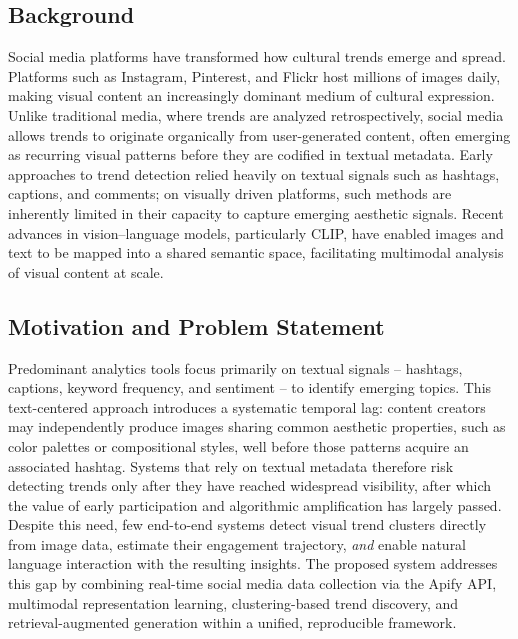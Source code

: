 \documentclass[conference]{IEEEtran}
\begin{document}
\subsection{Background}
Social media platforms have transformed how cultural trends emerge and spread. Platforms such as Instagram, Pinterest, and Flickr host millions of images daily, making visual content an increasingly dominant medium of cultural expression. Unlike traditional media, where trends are analyzed retrospectively, social media allows trends to originate organically from user-generated content, often emerging as recurring visual patterns before they are codified in textual metadata. Early approaches to trend detection relied heavily on textual signals such as hashtags, captions, and comments; on visually driven platforms, such methods are inherently limited in their capacity to capture emerging aesthetic signals. Recent advances in vision--language models, particularly CLIP, have enabled images and text to be mapped into a shared semantic space, facilitating multimodal analysis of visual content at scale.

\subsection{Motivation and Problem Statement}
Predominant analytics tools focus primarily on textual signals -- hashtags, captions, keyword frequency, and sentiment -- to identify emerging topics. This text-centered approach introduces a systematic temporal lag: content creators may independently produce images sharing common aesthetic properties, such as color palettes or compositional styles, well before those patterns acquire an associated hashtag. Systems that rely on textual metadata therefore risk detecting trends only after they have reached widespread visibility, after which the value of early participation and algorithmic amplification has largely passed. Despite this need, few end-to-end systems detect visual trend clusters directly from image data, estimate their engagement trajectory, \emph{and} enable natural language interaction with the resulting insights. The proposed system addresses this gap by combining real-time social media data collection via the Apify API, multimodal representation learning, clustering-based trend discovery, and retrieval-augmented generation within a unified, reproducible framework.
\end{document}
